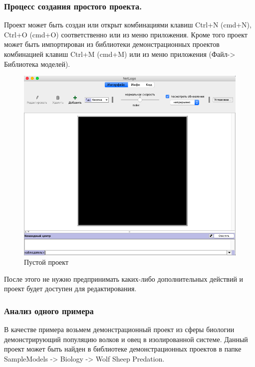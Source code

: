 \documentclass[14pt,a4paper,report]{report}
\begin{document}
\subsubsection{Процесс создания простого проекта.}

Проект может быть создан или открыт комбинациями клавиш Ctrl+N (cmd+N), Ctrl+O (cmd+O) соответственно или из меню приложения. Кроме того проект может быть импортирован из библиотеки демонстрационных проектов комбинацией клавиш Ctrl+M (cmd+M) или из меню приложения (Файл-> Библиотека моделей).

\begin{figure}[h!]
	\centering
	\includegraphics[scale = 0.33]{images/1.png}
	\caption{Пустой проект}
\end{figure}

После этого не нужно предпринимать каких-либо дополнительных действий и проект будет доступен для редактирования.

\subsubsection{Анализ одного примера}

В качестве примера возьмем демонстрационный проект из сферы биологии демонстрирующий популяцию волков и овец в изолированной системе. Данный проект может быть найден в библиотеке демонстрационных проектов в папке SampleModels -> Biology -> Wolf Sheep Predation.
\end{document}
